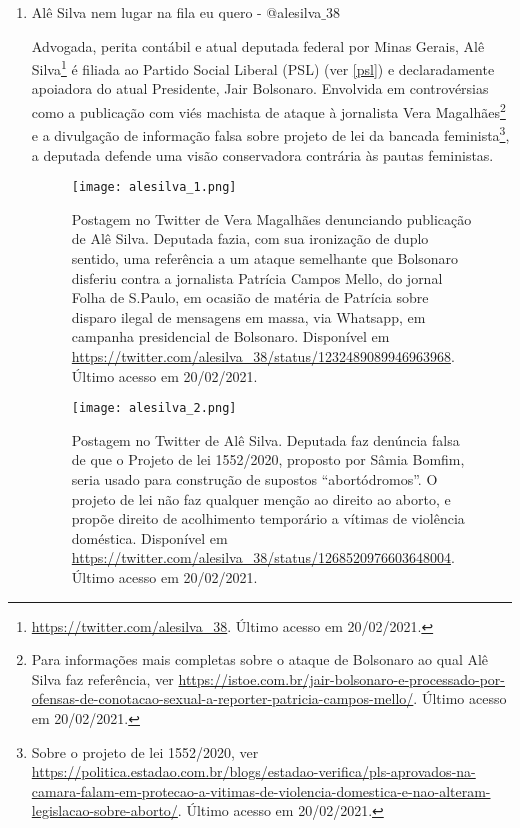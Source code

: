 \documentclass[
	12pt,				%
	openright,			%
	twoside,			%
	a4paper,			%
	english,			%
	brazil				%
	]{abntex2}
\begin{document}
\begin{anexosenv}
\begin{enumerate}

 \item Alê Silva nem lugar na fila eu quero - @alesilva$\_$38
 
 Advogada, perita contábil e atual deputada federal por Minas Gerais, Alê Silva\footnote{\url{https://twitter.com/alesilva_38}. Último acesso em 20/02/2021.} é filiada ao Partido Social Liberal (PSL) (ver \ref{psl}) e declaradamente apoiadora do atual Presidente, Jair Bolsonaro. Envolvida em controvérsias como a publicação com viés machista de ataque à jornalista Vera Magalhães\footnote{Para informações mais completas sobre o ataque de Bolsonaro ao qual Alê Silva faz referência, ver \url{https://istoe.com.br/jair-bolsonaro-e-processado-por-ofensas-de-conotacao-sexual-a-reporter-patricia-campos-mello/}. Último acesso em 20/02/2021.} e a divulgação de informação falsa sobre projeto de lei da bancada feminista\footnote{Sobre o projeto de lei 1552/2020, ver \url{https://politica.estadao.com.br/blogs/estadao-verifica/pls-aprovados-na-camara-falam-em-protecao-a-vitimas-de-violencia-domestica-e-nao-alteram-legislacao-sobre-aborto/}. Último acesso em 20/02/2021.}, a deputada defende uma visão conservadora contrária às pautas feministas.

 \begin{figure}[!htbp]
    \centering
    \texttt{[image: alesilva\_1.png]}
    \caption{Postagem no Twitter de Vera Magalhães denunciando publicação de Alê Silva. Deputada fazia, com sua ironização de duplo sentido, uma referência a um ataque semelhante que Bolsonaro disferiu contra a jornalista Patrícia Campos Mello, do jornal Folha de S.Paulo, em ocasião de matéria de Patrícia sobre disparo ilegal de mensagens em massa, via Whatsapp, em campanha presidencial de Bolsonaro. Disponível em \url{https://twitter.com/alesilva_38/status/1232489089946963968}. Último acesso em 20/02/2021.}
    \label{fig:alesilvafuro}
 \end{figure}

 \begin{figure}[!htbp]
    \centering
    \texttt{[image: alesilva\_2.png]}
    \caption{Postagem no Twitter de Alê Silva. Deputada faz denúncia falsa de que o Projeto de lei 1552/2020, proposto por Sâmia Bomfim, seria usado para construção de supostos ``abortódromos''. O projeto de lei não faz qualquer menção ao direito ao aborto, e propõe direito de acolhimento temporário a vítimas de violência doméstica. Disponível em \url{https://twitter.com/alesilva_38/status/1268520976603648004}. Último acesso em 20/02/2021.}
    \label{fig:alesilvapl}
 \end{figure}


\end{enumerate}
\end{anexosenv}
\end{document}
